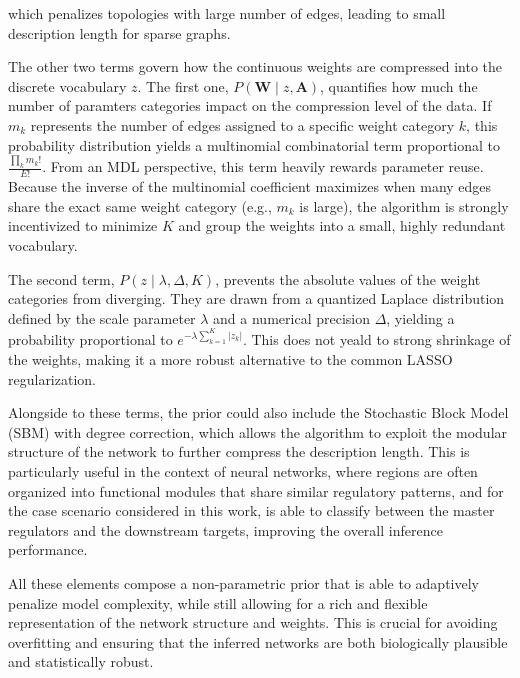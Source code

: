 \documentclass[10pt, aps, rmp,  twocolumn, superscriptaddress, floatfix, showkeys]{revtex4-2}
\begin{document}
which penalizes topologies with large number of edges, leading to small description length for sparse graphs.

The other two terms govern how the continuous weights are compressed into the discrete vocabulary $z$. The first one, $P(\mathbf{W} \mid z, \mathbf{A})$, quantifies how much the number of paramters categories impact on the compression level of the data.
If $m_k$ represents the number of edges assigned to a specific weight category $k$, this probability distribution yields a multinomial combinatorial term proportional to $\frac{\prod_k m_k!}{E!}$. From an MDL perspective, this term heavily rewards parameter reuse. Because the inverse of the multinomial coefficient maximizes when many edges share the exact same weight category (e.g., $m_k$ is large), the algorithm is strongly incentivized to minimize $K$ and group the weights into a small, highly redundant vocabulary.

The second term, $P(z \mid \lambda, \Delta, K)$, prevents the absolute values of the weight categories from diverging. They are drawn from a quantized Laplace distribution defined by the scale parameter $\lambda$ and a numerical precision $\Delta$, yielding a probability proportional to $e^{-\lambda \sum_{k=1}^K |z_k|}$. This does not yeald to strong shrinkage of the weights, making it a more robust alternative to the common LASSO regularization.

Alongside to these terms, the prior could also include the Stochastic Block Model (SBM) with degree correction, which allows the algorithm to exploit the modular structure of the network to further compress the description length. This is particularly useful in the context of neural networks, where regions are often organized into functional modules that share similar regulatory patterns, and for the case scenario considered in this work, is able to classify between the master regulators and the downstream targets, improving the overall inference performance.

All these elements compose a non-parametric prior that is able to adaptively penalize model complexity, while still allowing for a rich and flexible representation of the network structure and weights. This is crucial for avoiding overfitting and ensuring that the inferred networks are both biologically plausible and statistically robust.

\end{document}
